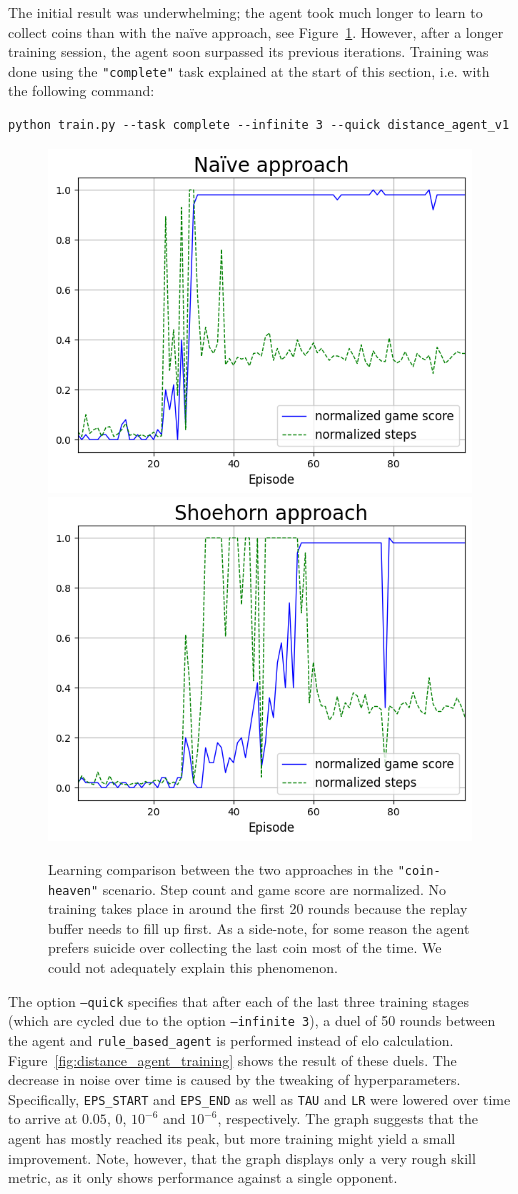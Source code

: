 \documentclass{article}
\begin{document}
The initial result was underwhelming; the agent took much longer to learn to collect coins than with the naïve approach, see Figure~\ref{fig:coin_collection_comparison}. However, after a longer training session, the agent soon surpassed its previous iterations. Training was done using the \texttt{"complete"} task explained at the start of this section, i.e. with the following command:

\begin{verbatim}
python train.py --task complete --infinite 3 --quick distance_agent_v1
\end{verbatim}

\begin{figure}[h]
    \centering
    \includegraphics[width=.46\linewidth]{figures/coin_collection_naive.png}
    \includegraphics[width=.46\linewidth]{figures/coin_collection_shoehorn.png}
    \caption{Learning comparison between the two approaches in the \texttt{"coin-heaven"} scenario. Step count and game score are normalized. No training takes place in around the first 20 rounds because the replay buffer needs to fill up first. As a side-note, for some reason the agent prefers suicide over collecting the last coin most of the time. We could not adequately explain this phenomenon.}
    \label{fig:coin_collection_comparison}
\end{figure}

The option \texttt{--quick} specifies that after each of the last three training stages (which are cycled due to the option \texttt{--infinite 3}), a duel of 50 rounds between the agent and \texttt{rule\_based\_agent} is performed instead of elo calculation. Figure~\ref{fig:distance_agent_training} shows the result of these duels. The decrease in noise over time is caused by the tweaking of hyperparameters. Specifically, \texttt{EPS\_START} and \texttt{EPS\_END} as well as \texttt{TAU} and \texttt{LR} were lowered over time to arrive at $0.05$, $0$, $10^{-6}$ and $10^{-6}$, respectively. The graph suggests that the agent has mostly reached its peak, but more training might yield a small improvement. Note, however, that the graph displays only a very rough skill metric, as it only shows performance against a single opponent.
\end{document}
